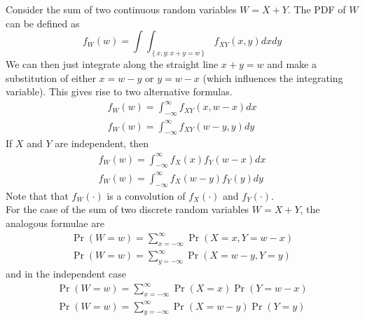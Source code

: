 \documentclass[11pt]{report} %
\begin{document}
Consider the sum of two continuous random variables $W = X + Y$. The PDF of $W$ can be defined as
\begin{equation}
f_{W}\left(w\right) = \int\int_{\left\{x,y: x + y = w\right\}}f_{XY}\left(x, y\right)dxdy
\end{equation}
We can then just integrate along the straight line $x + y = w$ and make a substitution of either $x = w - y$ or $y = w - x$ (which influences the integrating variable). This gives rise to two alternative formulas.
\begin{gather}
f_{W}\left(w\right) = \int_{-\infty}^{\infty}f_{XY}\left(x, w-x\right)dx \\
f_{W}\left(w\right) = \int_{-\infty}^{\infty}f_{XY}\left(w - y, y\right)dy
\end{gather}
If $X$ and $Y$ are independent, then
\begin{gather}
f_{W}\left(w\right) = \int_{-\infty}^{\infty}f_{X}\left(x\right)f_{Y}\left(w-x\right)dx \\
f_{W}\left(w\right) = \int_{-\infty}^{\infty}f_{X}\left(w - y\right)f_{Y}\left(y\right)dy
\end{gather}
Note that that $f_{W}\left(\cdot\right)$ is a convolution of $f_{X}\left(\cdot\right)$ and $f_{Y}\left(\cdot\right)$. \\

For the case of the sum of two discrete random variables $W = X + Y$, the analogous formulae are
\begin{gather}
\operatorname{Pr}\left(W = w\right) = \sum_{x = -\infty}^{\infty}\operatorname{Pr}\left(X = x, Y = w - x\right) \\
\operatorname{Pr}\left(W = w\right) = \sum_{y = -\infty}^{\infty}\operatorname{Pr}\left(X = w - y, Y = y\right)
\end{gather}
and in the independent case
\begin{gather}
\operatorname{Pr}\left(W = w\right) = \sum_{x = -\infty}^{\infty}\operatorname{Pr}\left(X = x\right)\operatorname{Pr}\left(Y = w - x\right) \\
\operatorname{Pr}\left(W = w\right) = \sum_{y = -\infty}^{\infty}\operatorname{Pr}\left(X = w - y\right)\operatorname{Pr}\left(Y = y\right)
\end{gather}
\end{document}
